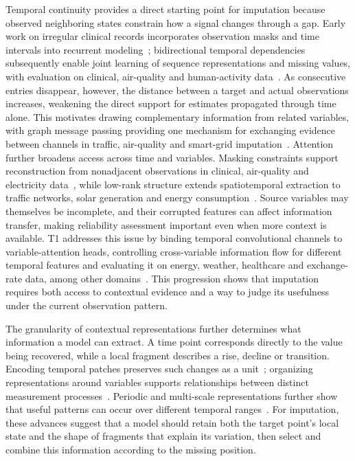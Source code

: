 Temporal continuity provides a direct starting point for imputation because observed neighboring states constrain how a signal changes through a gap. Early work on irregular clinical records incorporates observation masks and time intervals into recurrent modeling~\citep{grud}; bidirectional temporal dependencies subsequently enable joint learning of sequence representations and missing values, with evaluation on clinical, air-quality and human-activity data~\citep{brits}. As consecutive entries disappear, however, the distance between a target and actual observations increases, weakening the direct support for estimates propagated through time alone. This motivates drawing complementary information from related variables, with graph message passing providing one mechanism for exchanging evidence between channels in traffic, air-quality and smart-grid imputation~\citep{grin}. Attention further broadens access across time and variables. Masking constraints support reconstruction from nonadjacent observations in clinical, air-quality and electricity data~\citep{saits}, while low-rank structure extends spatiotemporal extraction to traffic networks, solar generation and energy consumption~\citep{imputeformer}. Source variables may themselves be incomplete, and their corrupted features can affect information transfer, making reliability assessment important even when more context is available. T1 addresses this issue by binding temporal convolutional channels to variable-attention heads, controlling cross-variable information flow for different temporal features and evaluating it on energy, weather, healthcare and exchange-rate data, among other domains~\citep{t1}. This progression shows that imputation requires both access to contextual evidence and a way to judge its usefulness under the current observation pattern.

The granularity of contextual representations further determines what information a model can extract. A time point corresponds directly to the value being recovered, while a local fragment describes a rise, decline or transition. Encoding temporal patches preserves such changes as a unit~\citep{patchtst}; organizing representations around variables supports relationships between distinct measurement processes~\citep{itransformer}. Periodic and multi-scale representations further show that useful patterns can occur over different temporal ranges~\citep{timesnet,timemixerpp}. For imputation, these advances suggest that a model should retain both the target point's local state and the shape of fragments that explain its variation, then select and combine this information according to the missing position.

